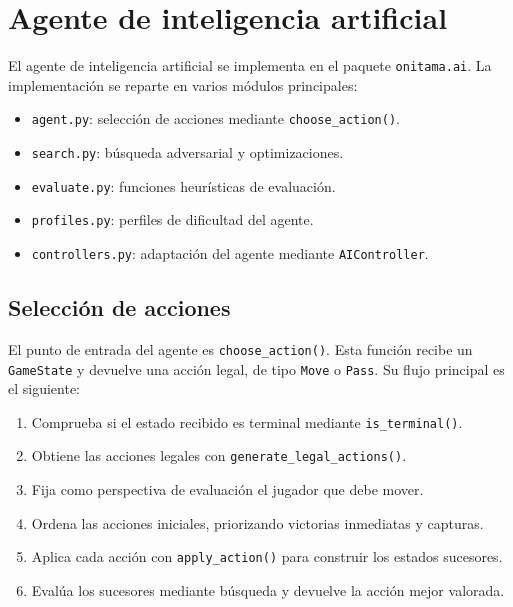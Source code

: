 \section{Agente de inteligencia artificial}
\label{sec:agente-ia}

El agente de inteligencia artificial se implementa en el paquete \texttt{onitama.ai}. La implementación se reparte en varios módulos principales:

\begin{itemize}
    \item \texttt{agent.py}: selección de acciones mediante \texttt{choose\_action()}.
    \item \texttt{search.py}: búsqueda adversarial y optimizaciones.
    \item \texttt{evaluate.py}: funciones heurísticas de evaluación.
    \item \texttt{profiles.py}: perfiles de dificultad del agente.
    \item \texttt{controllers.py}: adaptación del agente mediante \texttt{AIController}.
\end{itemize}

\subsection{Selección de acciones}
\label{subsec:seleccion-acciones-ia}

El punto de entrada del agente es \texttt{choose\_action()}. Esta función recibe un \texttt{GameState} y devuelve una acción legal, de tipo \texttt{Move} o \texttt{Pass}. Su flujo principal es el siguiente:

\begin{enumerate}
    \item Comprueba si el estado recibido es terminal mediante \texttt{is\_terminal()}.
    \item Obtiene las acciones legales con \texttt{generate\_legal\_actions()}.
    \item Fija como perspectiva de evaluación el jugador que debe mover.
    \item Ordena las acciones iniciales, priorizando victorias inmediatas y capturas.
    \item Aplica cada acción con \texttt{apply\_action()} para construir los estados sucesores.
    \item Evalúa los sucesores mediante búsqueda y devuelve la acción mejor valorada.
\end{enumerate}

